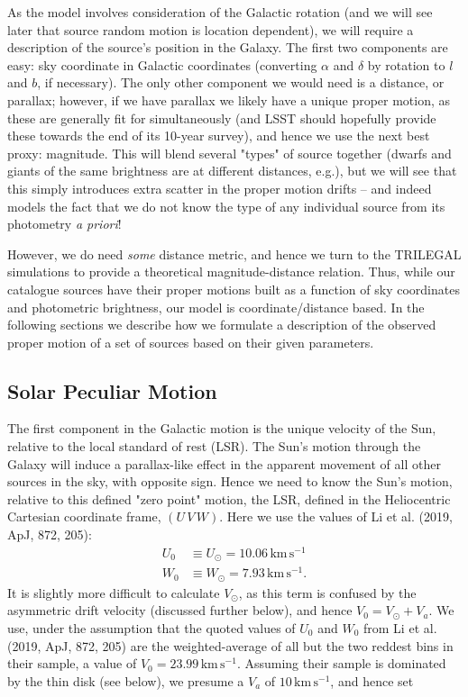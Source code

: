 \documentclass[fleqn,usenatbib]{mnras}
\begin{document}
As the model involves consideration of the Galactic rotation (and we will see later that source random motion is location dependent), we will require a description of the source's position in the Galaxy.
The first two components are easy: sky coordinate in Galactic coordinates (converting $\alpha$ and $\delta$ by rotation to $l$ and $b$, if necessary).
The only other component we would need is a distance, or parallax; however, if we have parallax we likely have a unique proper motion, as these are generally fit for simultaneously (and LSST should hopefully provide these towards the end of its 10-year survey), and hence we use the next best proxy: magnitude.
This will blend several "types" of source together (dwarfs and giants of the same brightness are at different distances, e.g.), but we will see that this simply introduces extra scatter in the proper motion drifts -- and indeed models the fact that we do not know the type of any individual source from its photometry \textit{a priori}!

However, we do need \textit{some} distance metric, and hence we turn to the TRILEGAL simulations \citep{Girardi2005} to provide a theoretical magnitude-distance relation.
Thus, while our catalogue sources have their proper motions built as a function of sky coordinates and photometric brightness, our model is coordinate/distance based.
In the following sections we describe how we formulate a description of the observed proper motion of a set of sources based on their given parameters.

\subsection{Solar Peculiar Motion}
The first component in the Galactic motion is the unique velocity of the Sun, relative to the local standard of rest (LSR).
The Sun's motion through the Galaxy will induce a parallax-like effect in the apparent movement of all other sources in the sky, with opposite sign.
Hence we need to know the Sun's motion, relative to this defined "zero point" motion, the LSR, defined in the Heliocentric Cartesian coordinate frame, $(U\,V\,W)$.
Here we use the values of Li et al. (2019, ApJ, 872, 205):
\begin{align}
    U_0 &\equiv U_\odot = 10.06\,\mathrm{km}\,\mathrm{s}^{-1} \\
    W_0 &\equiv W_\odot = 7.93\,\mathrm{km}\,\mathrm{s}^{-1}.
\end{align}
It is slightly more difficult to calculate $V_\odot$, as this term is confused by the asymmetric drift velocity (discussed further below), and hence $V_0 = V_\odot + V_a$.
We use, under the assumption that the quoted values of $U_0$ and $W_0$ from Li et al. (2019, ApJ, 872, 205) are the weighted-average of all but the two reddest bins in their sample, a value of $V_0 = 23.99\,\mathrm{km}\,\mathrm{s}^{-1}$.
Assuming their sample is dominated by the thin disk (see below), we presume a $V_a$ of $10\,\mathrm{km}\,\mathrm{s}^{-1}$, and hence set
\end{document}

